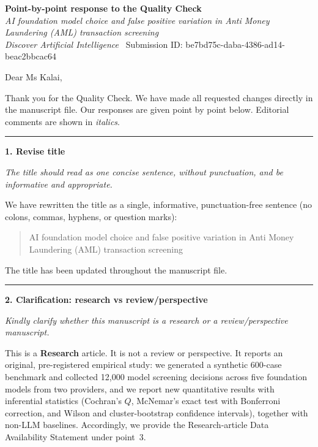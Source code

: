 \documentclass[11pt]{article}
\begin{document}
\begin{center}
{\large\bfseries Point-by-point response to the Quality Check}\\[3pt]
{\itshape AI foundation model choice and false positive variation in Anti Money Laundering (AML) transaction screening}\\[2pt]
{\small \emph{Discover Artificial Intelligence} \textbullet\ Submission ID: be7bd75c-daba-4386-ad14-beac2bbcac64}
\end{center}

\vspace{4pt}

Dear Ms Kalai,

Thank you for the Quality Check. We have made all requested changes directly in the manuscript file. Our responses are given point by point below. Editorial comments are shown in \emph{italics}.

\vspace{4pt}
\hrule
\vspace{6pt}

\textbf{1. Revise title}

\emph{The title should read as one concise sentence, without punctuation, and be informative and appropriate.}

We have rewritten the title as a single, informative, punctuation-free sentence (no colons, commas, hyphens, or question marks):

\begin{quote}
AI foundation model choice and false positive variation in Anti Money Laundering (AML) transaction screening
\end{quote}

The title has been updated throughout the manuscript file.

\vspace{6pt}
\hrule
\vspace{6pt}

\textbf{2. Clarification: research vs review/perspective}

\emph{Kindly clarify whether this manuscript is a research or a review/perspective manuscript.}

This is a \textbf{Research} article. It is not a review or perspective. It reports an original, pre-registered empirical study: we generated a synthetic 600-case benchmark and collected 12,000 model screening decisions across five foundation models from two providers, and we report new quantitative results with inferential statistics (Cochran's $Q$, McNemar's exact test with Bonferroni correction, and Wilson and cluster-bootstrap confidence intervals), together with non-LLM baselines. Accordingly, we provide the Research-article Data Availability Statement under point~3.
\end{document}
